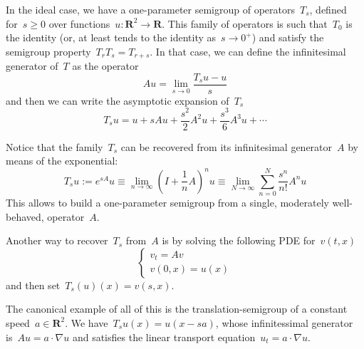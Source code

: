 \documentclass[12pt]{article}                  %
\begin{document}
%
%
%
%
%
%
%

In the ideal case, we have a one-parameter semigroup of operators~$T_s$,
defined for~$s\ge 0$ over functions~$u:\mathbf{R}^2\to\mathbf{R}$.
This family of operators is such that~$T_0$ is the identity (or, at
least tends to the identity as~$s\to 0^+$) and satisfy the semigroup
property~$T_rT_s=T_{r+s}$.  In that case, we can define the infinitesimal
generator of~$T$ as the operator
\[
	Au = \lim_{s\to0}\frac{T_su-u}s
\]
and then we can write the asymptotic expansion of~$T_s$
\[
	T_su = u + sAu + \frac{s^2}2 A^2u + \frac{s^3}6 A^3u+\cdots
\]

Notice that the family~$T_s$ can be recovered from its infinitesimal
generator~$A$ by means of the exponential:
\[
	T_su := e^{sA}u
	\equiv
	\lim_{n\to\infty}\left(I+\frac1nA\right)^nu
	\equiv
	\lim_{N\to\infty}\sum_{n=0}^N \frac{s^n}{n!}A^nu
\]
This allows to build a one-parameter semigroup from a single, moderately
well-behaved, operator~$A$.

Another way to recover~$T_s$ from~$A$ is by solving the following PDE
for~$v(t,x)$
\[
	\begin{cases}
		v_t = Av  \\
		v(0,x)=u(x)
	\end{cases}
\]
and then set~$T_s(u)(x)=v(s,x)$.

The canonical example of all of this is the translation-semigroup of a
constant
speed~$a\in\mathbf{R}^2$.  We have~$T_su(x)=u(x-sa)$, whose infinitessimal
generator is~$Au=a\cdot\nabla u$ and satisfies the linear transport
equation~$u_t=a\cdot\nabla u$.
\end{document}
